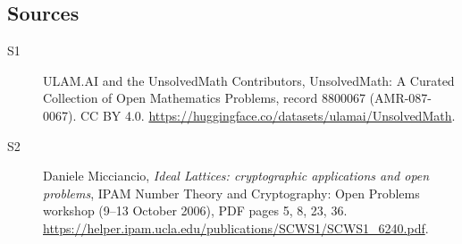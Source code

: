 \documentclass[11pt]{article}
\begin{document}
\subsection{Sources}
\begin{description}
\item[\hypertarget{source:8800067:1}{S1}] ULAM.AI and the UnsolvedMath Contributors, UnsolvedMath: A Curated Collection of Open Mathematics Problems, record 8800067 (AMR-087-0067). CC BY 4.0. \url{https://huggingface.co/datasets/ulamai/UnsolvedMath}.
\item[\hypertarget{source:8800067:2}{S2}] Daniele Micciancio, \emph{Ideal Lattices: cryptographic applications and open problems}, IPAM Number Theory and Cryptography: Open Problems workshop (9--13 October 2006), PDF pages 5, 8, 23, 36. \url{https://helper.ipam.ucla.edu/publications/SCWS1/SCWS1_6240.pdf}.
\end{description}
\label{end:8800067}
\end{document}
